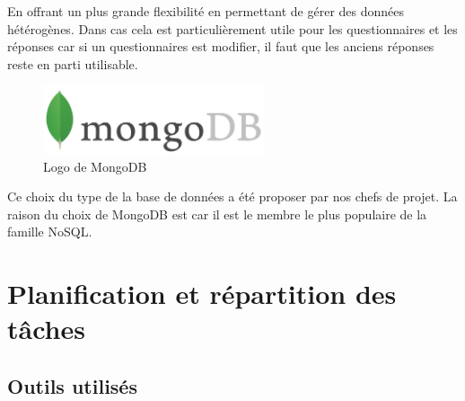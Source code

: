 En offrant un plus grande flexibilité en permettant de gérer des données hétérogènes. Dans cas cela est particulièrement utile pour les questionnaires et les réponses car si un questionnaires est modifier, il faut que les anciens réponses reste en parti utilisable.

\begin{figure}[H]
    \begin{center}
    \includegraphics[height=2.0cm]{img/mongodb}
    \end{center}
    \caption{Logo de MongoDB}
\end{figure}

Ce choix du type de la base de données a été proposer par nos chefs de projet. La raison du choix de MongoDB est car il est le membre le plus populaire de la famille NoSQL.   

\section{Planification et répartition des tâches}

\subsection{Outils utilisés}

